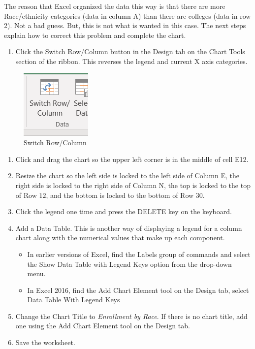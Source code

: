 The reason that Excel organized the data this way is that there are more Race/ethnicity categories (data in column A) than there are colleges (data in row 2). Not a bad guess. But, this is not what is wanted in this case. The next steps explain how to correct this problem and complete the chart.

\begin{enumerate}
	\item Click the Switch Row/Column button in the Design tab on the Chart Tools section of the ribbon. This reverses the legend and current X axis categories.
\end{enumerate}

\begin{figure}[H]
	\centering
	\includegraphics[width=\maxwidth{.95\linewidth}]{gfx/ch04_fig25}
	\caption{Switch Row/Column}
	\label{04:fig25}
\end{figure}

\begin{enumerate}[resume]
	\item Click and drag the chart so the upper left corner is in the middle of cell \textsf{E12}.
	\item Resize the chart so the left side is locked to the left side of Column E, the right side is locked to the right side of Column N, the top is locked to the top of Row $ 12 $, and the bottom is locked to the bottom of Row $ 30 $.
	\item Click the legend one time and press the DELETE key on the keyboard.
	\item Add a Data Table. This is another way of displaying a legend for a column chart along with the numerical values that make up each component.

	\begin{itemize}
		\item In earlier versions of Excel, find the Labels group of commands and select the Show Data Table with Legend Keys option from the drop-down menu.
		\item In Excel 2016, find the Add Chart Element tool on the Design tab, select Data Table With Legend Keys
	\end{itemize}

	\item Change the Chart Title to \textit{Enrollment by Race}. If there is no chart title, add one using the Add Chart Element tool on the Design tab.
	\item Save the worksheet.
\end{enumerate}


